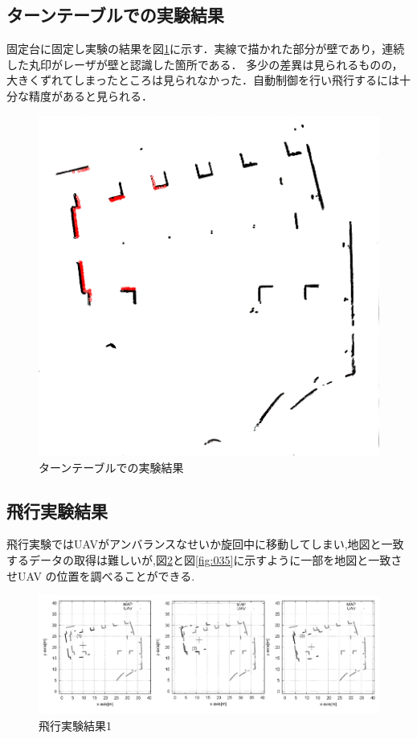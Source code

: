 \documentclass[12pt,oneside]{sotsuken_paper}
\begin{document}
\subsection{ターンテーブルでの実験結果}固定台に固定し実験の結果を図\ref{fig:9}に示す．実線で描かれた部分が壁であり，連続した丸印がレーザが壁と認識した箇所である．
多少の差異は見られるものの，大きくずれてしまったところは見られなかった．自動制御を行い飛行するには十分な精度があると見られる．

\begin{figure}[H]
\begin{center}
\includegraphics[width=120mm]{img/9.png}
\end{center}
\caption{ターンテーブルでの実験結果}
\label{fig:9}
\end{figure}

\subsection{飛行実験結果}飛行実験ではUAVがアンバランスなせいか旋回中に移動してしまい,地図と一致するデータの取得は難しいが,図\ref{fig:034}と図\ref{fig:035}に示すように一部を地図と一致させUAV
の位置を調べることができる.

\begin{figure}[H]
\begin{center}
\includegraphics[width=150mm]{img/034.png}
\end{center}
\caption{飛行実験結果1}
\label{fig:034}
\end{figure}
\end{document}
